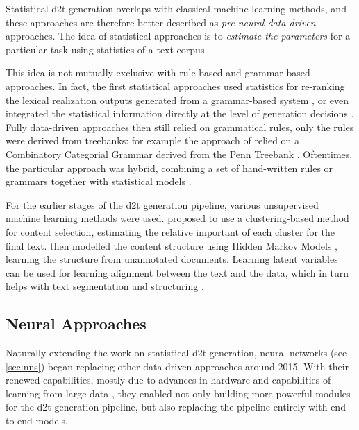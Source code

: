 Statistical \ac{d2t} generation overlaps with classical machine learning methods, and these approaches are therefore better described as \emph{pre-neural data-driven} approaches. The idea of statistical approaches is to \emph{estimate the parameters} for a particular task using statistics of a text corpus.

This idea is not mutually exclusive with rule-based and grammar-based approaches. In fact, the first statistical approaches used statistics for re-ranking the lexical realization outputs generated from a grammar-based system \cite{bangalore2000corpus,langkilde2000forest,ratnaparkhi2000trainable}, or even integrated the statistical information directly at the level of generation decisions \cite{belz2008automatic}. Fully data-driven approaches then still relied on grammatical rules, only the rules were derived from treebanks: for example the approach of \citet{white2007towards} relied on a Combinatory Categorial Grammar \cite{steedman2001syntactic} derived from the Penn Treebank \cite{hockenmaier2007ccgbank}. Oftentimes, the particular approach was hybrid, combining a set of hand-written rules or grammars together with statistical models \cite{konstas2012concept,gardent2017statistical}.

For the earlier stages of the \ac{d2t} generation pipeline, various unsupervised machine learning methods were used. \citet{duboue2003statistical} proposed to use a clustering-based method for content selection, estimating the relative important of each cluster for the final text. \citet{barzilay2004catching} then modelled the content structure using Hidden Markov Models \cite{baum1966statistical}, learning the structure from unannotated documents. Learning latent variables can be used for learning alignment between the text and the data, which in turn helps with text segmentation and structuring \cite{liang2009learning}.

\subsection{Neural Approaches}
\label{sec:neural-d2t}
Naturally extending the work on statistical \ac{d2t} generation, neural networks (see \autoref{sec:nns}) began replacing other data-driven approaches around 2015. With their renewed capabilities, mostly due to advances in hardware \cite{hooker2021hardware} and capabilities of learning from large data \cite{lecun2015deep}, they enabled not only building more powerful modules for the \ac{d2t} generation pipeline, but also replacing the pipeline entirely with end-to-end models.


